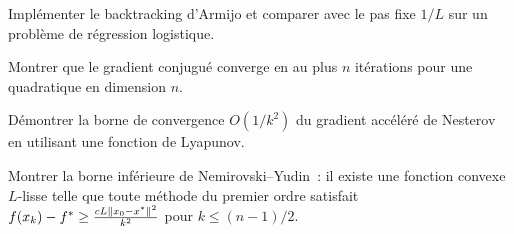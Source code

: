 \begin{exercice}[$\star\star$]
Impl\'ementer le backtracking d'Armijo et comparer avec le pas fixe $1/L$ sur
un probl\`eme de r\'egression logistique.
\end{exercice}

\begin{exercice}[$\star\star$]
Montrer que le gradient conjugu\'e converge en au plus $n$ it\'erations pour une
quadratique en dimension $n$.
\end{exercice}

\begin{exercice}[$\star\star\star$]
D\'emontrer la borne de convergence $O(1/k^2)$ du gradient acc\'el\'er\'e de
Nesterov en utilisant une fonction de Lyapunov.
\end{exercice}

\begin{exercice}[$\star\star\star$]
Montrer la borne inf\'erieure de Nemirovski--Yudin~: il existe une fonction convexe
$L$-lisse telle que toute m\'ethode du premier ordre satisfait
$f(x_k) - f^* \geq \frac{cL\left\| x_0-x^* \right\|^2}{k^2}$ pour $k \leq (n-1)/2$.
\end{exercice}
